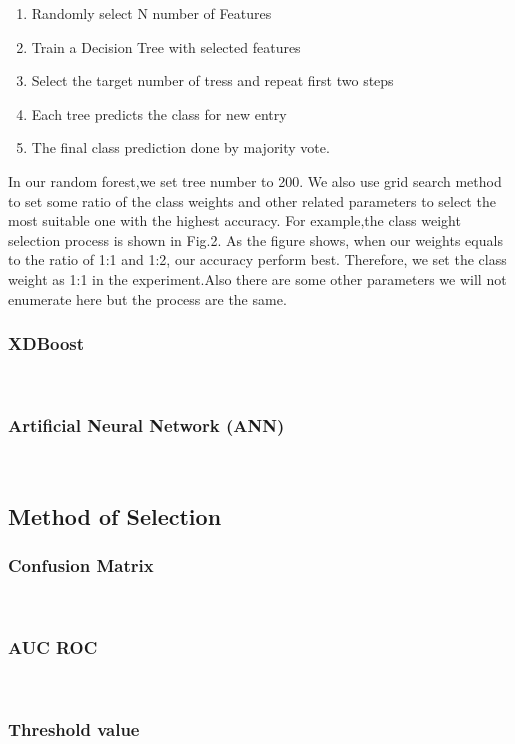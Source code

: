 \begin{enumerate}
    \item Randomly select N number of Features
    \item Train a Decision Tree with selected features
    \item Select the target number of tress and repeat first two steps 
    \item Each tree predicts the class for new entry
    \item The final class prediction done by majority vote. 
\end{enumerate}

In our random forest,we set tree number to 200. We also use grid search method to set some ratio of the class weights and other related parameters to select the most suitable one with the highest accuracy. For example,the class weight selection process is shown in Fig.2. As the figure shows, when our weights equals to the ratio of 1:1 and 1:2, our accuracy perform best. Therefore, we set the class weight as 1:1 in the experiment.Also there are some other parameters we will not enumerate here but the process are the same. 

\subsubsection{XDBoost}\hspace*{\fill} \\
\subsubsection{Artificial Neural Network (ANN)}\hspace*{\fill} \\





\subsection{Method of Selection}
\subsubsection{Confusion Matrix}\hspace*{\fill} \\
\subsubsection{AUC ROC}\hspace*{\fill} \\
\subsubsection{Threshold value}\hspace*{\fill} \\

